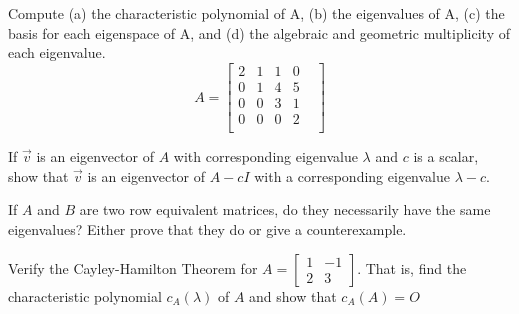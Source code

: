 \documentclass[12pt,letterpaper]{hmcpset}
\begin{document}
\section*{}
\problemlist{}


\begin{problem}[4.3 \#10]
    Compute (a) the characteristic polynomial of A, (b) the eigenvalues of A, (c) the basis for each eigenspace of A, and (d) the algebraic and geometric multiplicity of each eigenvalue.
    \[A=\begin{bmatrix}
    2 & 1 & 1 & 0 & \\
    0 & 1 & 4 & 5 & \\
    0 & 0 & 3 & 1 & \\
    0 & 0 & 0 & 2 & \\
    \end{bmatrix}
    \]
\end{problem}

\begin{solution}
    \vfill
\end{solution}

\newpage

\begin{problem}[4.3.\#22]
    If $\vec{v}$ is an eigenvector of $A$ with corresponding eigenvalue $\lambda$ and $c$ is a scalar, show that $\vec{v}$ is an eigenvector of $A - cI$ with a corresponding eigenvalue $\lambda - c$.
\end{problem}

\begin{solution}
    \vfill
\end{solution}

\newpage

\begin{problem}[4.3 \#25]
    If $A$ and $B$ are two row equivalent matrices, do they necessarily have the same eigenvalues? Either prove that they do or give a counterexample.
\end{problem}

\begin{solution}
    \vfill
\end{solution}

\newpage

\begin{problem}[4.3 \#33]
    Verify the Cayley-Hamilton Theorem for $A=\begin{bmatrix}
    1 & -1 \\ 
    2 & 3
    \end{bmatrix} $. That is, find the characteristic polynomial $c_A(\lambda)$ of $A$ and show that $c_A(A) = O$
\end{problem}
\end{document}
